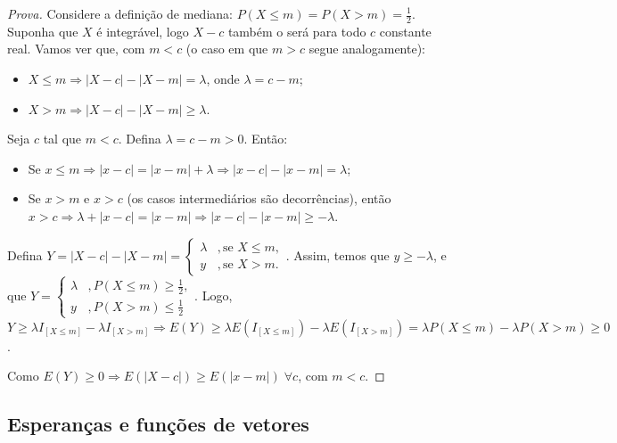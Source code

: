 \documentclass[
]{article}
\providecommand{\tightlist}{%
  \setlength{\itemsep}{0pt}\setlength{\parskip}{0pt}}
\theoremstyle{definition}
\theoremstyle{definition}
\theoremstyle{definition}
\theoremstyle{definition}
\theoremstyle{remark}
\begin{document}
\begin{proof}[Prova]
Considere a definição de mediana: \(P(X \le m) = P(X > m) = \frac{1}{2}\). Suponha que \(X\) é integrável, logo \(X - c\) também o será para todo \(c\) constante real. Vamos ver que, com \(m < c\) (o caso em que \(m > c\) segue analogamente):

\begin{itemize}
\tightlist
\item
  \(X \le m \Rightarrow |X - c| - |X - m| = \lambda\), onde \(\lambda = c - m\);
\item
  \(X > m \Rightarrow |X - c| - |X - m| \ge \lambda\).
\end{itemize}

Seja \(c\) tal que \(m < c\). Defina \(\lambda = c - m > 0\). Então:

\begin{itemize}
\tightlist
\item
  Se \(x \le m \Rightarrow |x - c| = |x - m| + \lambda \Rightarrow |x - c| - |x - m| = \lambda\);
\item
  Se \(x > m\) e \(x > c\) (os casos intermediários são decorrências), então \(x > c \Rightarrow \lambda + |x - c| = |x - m| \Rightarrow |x - c| - |x - m| \ge - \lambda\).
\end{itemize}

Defina \(Y = |X - c| - |X - m| = \begin{cases} \lambda & ,\text{se } X \le m, \\ y & ,\text{se }X > m. \end{cases}\). Assim, temos que \(y \ge -\lambda\), e que \(Y = \begin{cases} \lambda & ,P(X \le m) \ge \frac{1}{2}, \\ y &,P(X > m) \le \frac{1}{2} \end{cases}\). Logo, \(Y \ge \lambda I_{[X \le m]} - \lambda I_{[X > m]} \Rightarrow E(Y) \ge \lambda E(I_{[X \le m]}) - \lambda E(I_{[X > m]}) = \lambda P(X \le m) - \lambda P(X > m) \ge 0\).

Como \(E(Y) \ge 0 \Rightarrow E(|X - c|) \ge E(|x - m|) \; \forall c\), com \(m < c\).
\end{proof}

\hypertarget{esperanuxe7as-e-funuxe7uxf5es-de-vetores}{%
\subsection{Esperanças e funções de vetores}\label{esperanuxe7as-e-funuxe7uxf5es-de-vetores}}
\end{document}
